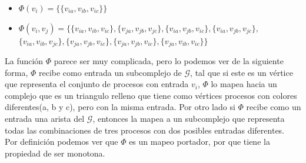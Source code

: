\documentclass{article}
\begin{document}
\begin{enumerate}
{      \begin{itemize}
        
        \item{
            $\Phi(v_i) = \{\{v_{ia}, v_{ib}, v_{ic}\}\}$
          }

          \item{
              $\Phi({v_i,v_j}) =  \{\{v_{ia}, v_{ib}, v_{ic}\},
              \{v_{ja}, v_{jb}, v_{jc}\}, \{v_{ia}, v_{jb}, v_{ic}\},
              \{v_{ia}, v_{jb}, v_{jc}\}, $\\
              $\{v_{ia}, v_{ib}, v_{jc}\},
              \{v_{ja}, v_{jb}, v_{ic}\}, \{v_{ja}, v_{jb}, v_{ic}\},
              \{v_{ja},v_{ib}, v_{ic}\}
              \}$ \\
            }
        
      \end{itemize}

      La función $\Phi$ parece ser muy complicada, pero lo podemos ver
      de la siguiente forma, $\Phi$ recibe como entrada un
      subcomplejo de $\mathcal{G}$, tal que si este es un vértice que
      representa el conjunto de procesos con entrada $v_i$, $\Phi$ lo
      mapea hacia un complejo que es un triangulo relleno que tiene
      como vértices procesos con colores diferentes(a, b y c), pero con la misma
      entrada. Por otro lado si $\Phi$ recibe como un entrada una
      arista del $\mathcal{G}$, entonces la mapea a un subcomplejo que
      representa todas las combinaciones de tres procesos con dos
      posibles entradas diferentes.\\ Por definición podemos ver que
      $\Phi$ es un mapeo portador, por que tiene la propiedad de ser monotona.
      
}
\end{enumerate}
\end{document}
